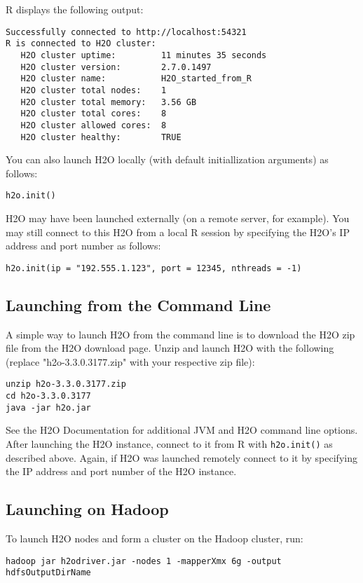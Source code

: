 R displays the following output: 
\begin{lstlisting}[style=R]
Successfully connected to http://localhost:54321
R is connected to H2O cluster:
   H2O cluster uptime:         11 minutes 35 seconds
   H2O cluster version:        2.7.0.1497
   H2O cluster name:           H2O_started_from_R
   H2O cluster total nodes:    1
   H2O cluster total memory:   3.56 GB
   H2O cluster total cores:    8
   H2O cluster allowed cores:  8
   H2O cluster healthy:        TRUE
\end{lstlisting}

You can also launch H2O locally (with default initiallization arguments) as follows:
\begin{lstlisting}[style=R]
h2o.init()
\end{lstlisting}

H2O may have been launched externally (on a remote server, for example). You may still connect to this H2O from a local R session by specifying the H2O's IP address and port number as follows:
\begin{lstlisting}[style=R]
h2o.init(ip = "192.555.1.123", port = 12345, nthreads = -1)
\end{lstlisting}


\subsection{Launching from the Command Line}

A simple way to launch H2O from the command line is to download the H2O zip file from the H2O download page. Unzip and
launch H2O with the following (replace "h2o-3.3.0.3177.zip" with your respective zip file):
\begin{lstlisting}[style=R]
unzip h2o-3.3.0.3177.zip
cd h2o-3.3.0.3177
java -jar h2o.jar
\end{lstlisting}
See the H2O Documentation for additional JVM and H2O command line options.
After launching the H2O instance, connect to it from R with {\texttt{h2o.init()}} as described above. Again, if H2O was launched remotely
connect to it by specifying the IP address and port number of the H2O instance.

\subsection{Launching on Hadoop}

To launch H2O nodes and form a cluster on the Hadoop cluster, run:
\begin{lstlisting}[style=R]
hadoop jar h2odriver.jar -nodes 1 -mapperXmx 6g -output hdfsOutputDirName
\end{lstlisting}

